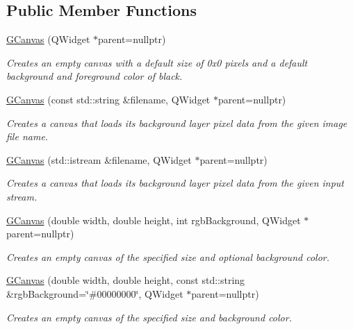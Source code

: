 \subsection*{Public Member Functions}
\begin{DoxyCompactItemize}
\item 
\mbox{\hyperlink{classGCanvas_abb7f95d00cbfadedab276958e1eb2af1}{G\+Canvas}} (Q\+Widget $\ast$parent=nullptr)
\begin{DoxyCompactList}\small\item\em Creates an empty canvas with a default size of 0x0 pixels and a default background and foreground color of black. \end{DoxyCompactList}\item 
\mbox{\hyperlink{classGCanvas_a0a9de139286d0fc9146928aff8f0538c}{G\+Canvas}} (const std\+::string \&filename, Q\+Widget $\ast$parent=nullptr)
\begin{DoxyCompactList}\small\item\em Creates a canvas that loads its background layer pixel data from the given image file name. \end{DoxyCompactList}\item 
\mbox{\hyperlink{classGCanvas_a18f1866349219dd73545c6b548ff3b0e}{G\+Canvas}} (std\+::istream \&filename, Q\+Widget $\ast$parent=nullptr)
\begin{DoxyCompactList}\small\item\em Creates a canvas that loads its background layer pixel data from the given input stream. \end{DoxyCompactList}\item 
\mbox{\hyperlink{classGCanvas_a235f6b1b700354d6737607562df06581}{G\+Canvas}} (double width, double height, int rgb\+Background, Q\+Widget $\ast$parent=nullptr)
\begin{DoxyCompactList}\small\item\em Creates an empty canvas of the specified size and optional background color. \end{DoxyCompactList}\item 
\mbox{\hyperlink{classGCanvas_af8bb8bd29201bbb5d0f90016a1d8df2c}{G\+Canvas}} (double width, double height, const std\+::string \&rgb\+Background=\char`\"{}\#00000000\char`\"{}, Q\+Widget $\ast$parent=nullptr)
\begin{DoxyCompactList}\small\item\em Creates an empty canvas of the specified size and background color. \end{DoxyCompactList}\item 

\end{DoxyCompactItemize}

